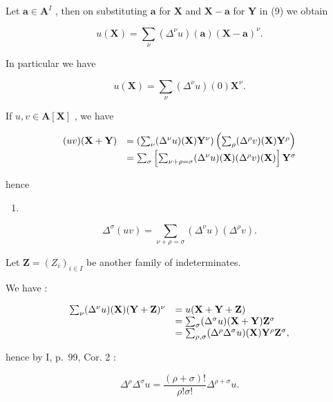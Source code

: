 Let \(\mathbf{a} \in \mathbf{A}^{I}\) , then on substituting \(\mathbf{a}\) for \(\mathbf{X}\) and \(\mathbf{X} - \mathbf{a}\) for \(\mathbf{Y}\) in (9) we obtain

\[
u (\mathbf {X}) = \sum_ {\nu} \left(\Delta^ {\nu} u\right) (\mathbf {a}) (\mathbf {X} - \mathbf {a}) ^ {\nu}.\tag{10}
\]

In particular we have

\[
u (\mathbf {X}) = \sum_ {\nu} \left(\Delta^ {\nu} u\right) (0) \mathbf {X} ^ {\nu}.\tag{11}
\]

If \(u, v \in \mathbf{A}[\mathbf{X}]\) , we have

\[
\begin{array}{r l} (u v) (\mathbf {X} + \mathbf {Y}) & = \left(\sum_ {\nu} (\Delta^ {\nu} u) (\mathbf {X}) \mathbf {Y} ^ {\nu}\right) \left(\sum_ {\rho} (\Delta^ {\rho} v) (\mathbf {X}) \mathbf {Y} ^ {\rho}\right) \\ & = \sum_ {\sigma} \left[ \sum_ {\nu + \rho = \sigma} (\Delta^ {\nu} u) (\mathbf {X}) (\Delta^ {\rho} v) (\mathbf {X}) \right] \mathbf {Y} ^ {\sigma} \end{array}
\]

hence

\begin{enumerate}
\def\labelenumi{(\arabic{enumi})}
\setcounter{enumi}{11}
\tightlist
\item
\end{enumerate}

\[
\Delta^ {\sigma} (u v) = \sum_ {\nu + \rho = \sigma} (\Delta^ {\nu} u) (\Delta^ {\rho} v).
\]

Let \(\mathbf{Z} = (Z_i)_{i\in I}\) be another family of indeterminates.

We have :

\[
\begin{array}{r l} \sum_ {\nu} (\Delta^ {\nu} u) (\mathbf {X}) (\mathbf {Y} + \mathbf {Z}) ^ {\nu} & = u (\mathbf {X} + \mathbf {Y} + \mathbf {Z}) \\ & = \sum_ {\sigma} (\Delta^ {\sigma} u) (\mathbf {X} + \mathbf {Y}) \mathbf {Z} ^ {\sigma} \\ & = \sum_ {\rho , \sigma} (\Delta^ {\rho} \Delta^ {\sigma} u) (\mathbf {X}) \mathbf {Y} ^ {\rho} \mathbf {Z} ^ {\sigma}, \end{array}
\]

hence by I, p.~99, Cor. 2 :

\[
\Delta^ {\rho} \Delta^ {\sigma} u = \frac {(\rho + \sigma) !}{\rho ! \sigma !} \Delta^ {\rho + \sigma} u.\tag{13}
\]

